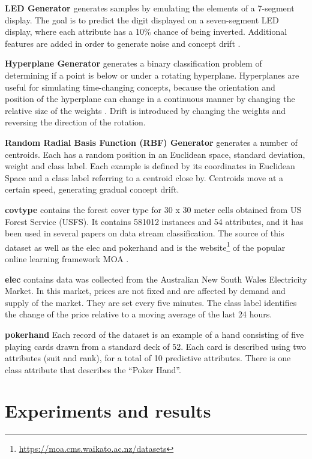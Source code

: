 \documentclass{sig-alternate-br}
\begin{document}
\textbf{LED Generator} generates samples by emulating the elements of a 7-segment display.
    The goal is to predict the digit displayed on a seven-segment LED display,
    where each attribute has a 10\% chance of being inverted. Additional features are added
    in order to generate noise and concept drift \cite{breiman1984classification}.

\textbf{Hyperplane Generator} generates a binary classification problem of determining if a point is below or under a rotating hyperplane.
    Hyperplanes are useful for simulating time-changing concepts, because the
    orientation and position of the hyperplane can change in a continuous manner
    by changing the relative size of the weights \cite{hulten2001mining}. Drift
    is introduced by changing the weights and reversing the direction of the rotation.
    
\textbf{Random Radial Basis Function (RBF) Generator} generates a number of centroids. Each
has a random position in an Euclidean space, standard deviation, weight and class label.
Each example is defined by its coordinates in Euclidean Space and a class label referring to a centroid close by. 
Centroids move at a certain speed, generating gradual concept drift. \cite{van2016massively}

\textbf{covtype} contains the forest cover type for 30 x 30 meter cells obtained from US Forest Service (USFS). It contains 581012 instances and 54 attributes, and it has been used in several papers on data stream classification. The source of this dataset as well as the elec and pokerhand and is the website\footnote{\url{https://moa.cms.waikato.ac.nz/datasets}} of the popular online learning framework MOA \cite{bifet2010moa}.

\textbf{elec} contains data was collected from the Australian New South Wales Electricity Market. In this market, prices are not fixed and are affected by demand and supply of the market. They are set every five minutes. The class label identifies the change of the price relative to a moving average of the last 24 hours.

\textbf{pokerhand} Each record of the dataset is an example of a hand consisting of five playing cards drawn from a standard deck of 52. Each card is described using two attributes (suit and rank), for a total of 10 predictive attributes. There is one class attribute that describes the “Poker Hand”.

\section{Experiments and results}
\label{experiments}
\end{document}
